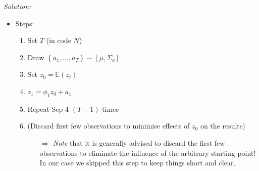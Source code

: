 \documentclass[12pt,a4paper]{article}
\begin{document}
\emph{Solution:}\\

\begin{itemize}
  \item Steps:
  \begin{enumerate}
    \item Set $T$ (in code $N$)
    \item Draw $\left\{ a_1, \ldots , a_T \right\} \sim \left[ \mu , \Sigma_a \right]$
    \item Set $z_0 = \mathbb{E} \left( z_t\right)$
    \item $z_1 = \phi_1 z_0 + a_1$
    \item Repeat Sep 4 $(T - 1)$ times
    \item (Discard first few observations to minimise effects of $z_0$ on the results)
    \begin{itemize}
      \item[$\Rightarrow$] \textit{Note} that it is generally advised to discard the first few observations to eliminate the influence of the arbitrary starting point! In our case we skipped this step to keep things short and clear.
    \end{itemize}
  \end{enumerate}
\end{itemize}
\end{document}
